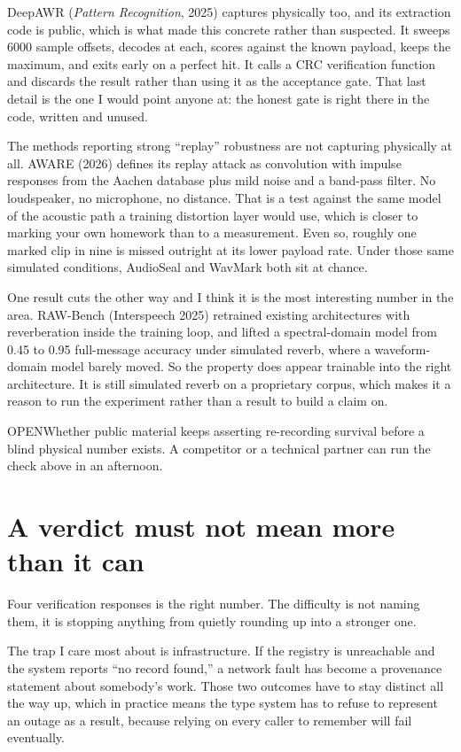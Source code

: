 \documentclass[11pt]{article}
\newcommand{\decision}[1]{%
  \par\vspace{4pt}%
  \noindent\textcolor{quiet}{\sansfont\footnotesize OPEN}\quad #1\par\vspace{2pt}}
\begin{document}
DeepAWR (\emph{Pattern Recognition}, 2025) captures physically too, and its
extraction code is public, which is what made this concrete rather than
suspected. It sweeps 6000 sample offsets, decodes at each, scores against the
known payload, keeps the maximum, and exits early on a perfect hit. It calls a
CRC verification function and discards the result rather than using it as the
acceptance gate. That last detail is the one I would point anyone at: the honest
gate is right there in the code, written and unused.

The methods reporting strong ``replay'' robustness are not capturing physically
at all. AWARE (2026) defines its replay attack as convolution with impulse
responses from the Aachen database plus mild noise and a band-pass filter. No
loudspeaker, no microphone, no distance. That is a test against the same model
of the acoustic path a training distortion layer would use, which is closer to
marking your own homework than to a measurement. Even so, roughly one marked clip
in nine is missed outright at its lower payload rate. Under those same simulated
conditions, AudioSeal and WavMark both sit at chance.

One result cuts the other way and I think it is the most interesting number in
the area. RAW-Bench (Interspeech 2025) retrained existing architectures with
reverberation inside the training loop, and lifted a spectral-domain model from
0.45 to 0.95 full-message accuracy under simulated reverb, where a
waveform-domain model barely moved. So the property does appear trainable into
the right architecture. It is still simulated reverb on a proprietary corpus,
which makes it a reason to run the experiment rather than a result to build a
claim on.

\decision{Whether public material keeps asserting re-recording survival before a
blind physical number exists. A competitor or a technical partner can run the
check above in an afternoon.}

\section{A verdict must not mean more than it can}

Four verification responses is the right number. The difficulty is not naming
them, it is stopping anything from quietly rounding up into a stronger one.

The trap I care most about is infrastructure. If the registry is unreachable and
the system reports ``no record found,'' a network fault has become a provenance
statement about somebody's work. Those two outcomes have to stay distinct all the
way up, which in practice means the type system has to refuse to represent an
outage as a result, because relying on every caller to remember will fail
eventually.
\end{document}
